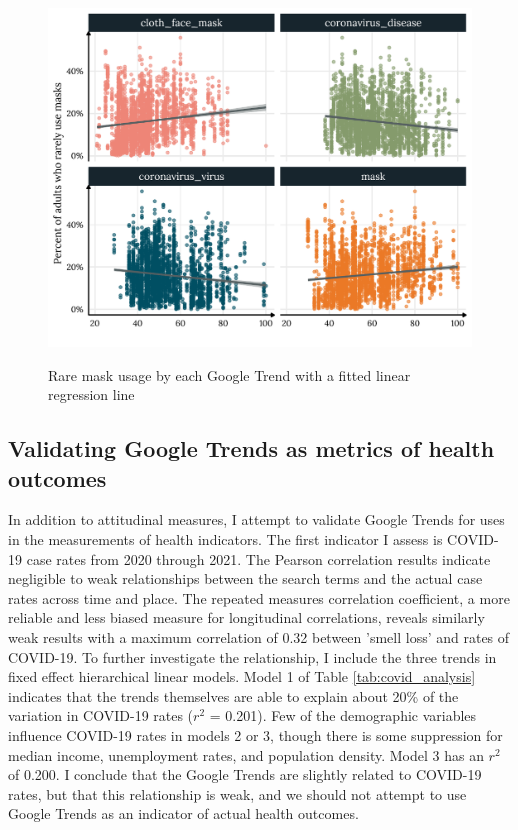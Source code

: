 
\begin{figure}[h]
{\centering \includegraphics[width=0.8\linewidth]{figs/paper1/mask_plot-1.pdf}}
\caption{Rare mask usage by each Google Trend with a fitted linear regression line}\label{fig:mask_plot-1}
\end{figure}


\subsection{Validating Google Trends as metrics of health outcomes}

In addition to attitudinal measures, I attempt to validate Google Trends for
uses in the measurements of health indicators. The first indicator I assess is
COVID-19 case rates from 2020 through 2021. The Pearson correlation results
indicate negligible to weak relationships between the search terms and the
actual case rates across time and place. The repeated measures correlation
coefficient, a more reliable and less biased measure for longitudinal
correlations, reveals similarly weak results with a maximum correlation of 0.32
between 'smell loss' and rates of COVID-19. To further investigate the
relationship, I include the three trends in fixed effect hierarchical linear
models. Model 1 of Table \ref{tab:covid_analysis} indicates that the trends
themselves are able to explain about 20\% of the variation in COVID-19 rates
($r^2$ = 0.201). Few of the demographic variables influence COVID-19 rates in
models 2 or 3, though there is some suppression for median income, unemployment
rates, and population density. Model 3 has an $r^2$ of 0.200. I conclude that
the Google Trends are slightly related to COVID-19 rates, but that this
relationship is weak, and we should not attempt to use Google Trends as an
indicator of actual health outcomes.

